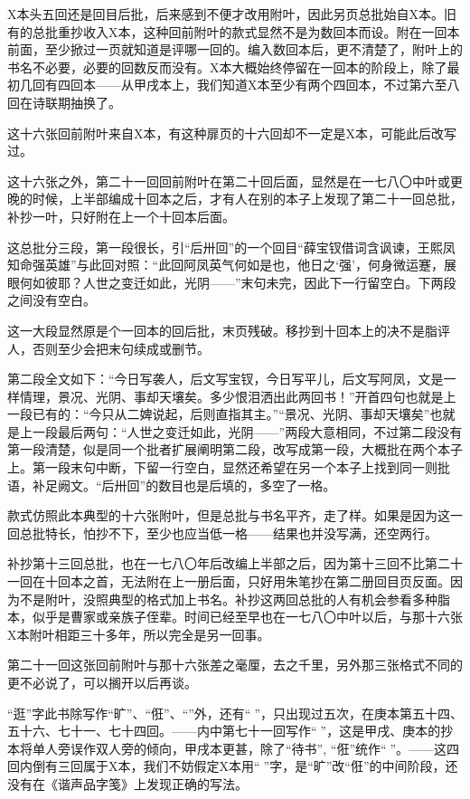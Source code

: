 \par X本头五回还是回目后批，后来感到不便才改用附叶，因此另页总批始自X本。旧有的总批重抄收入X本，这种回前附叶的款式显然不是为数回本而设。附在一回本前面，至少掀过一页就知道是评哪一回的。编入数回本后，更不清楚了，附叶上的书名不必要，必要的回数反而没有。X本大概始终停留在一回本的阶段上，除了最初几回有四回本——从甲戌本上，我们知道X本至少有两个四回本，不过第六至八回在诗联期抽换了。
\par 这十六张回前附叶来自X本，有这种扉页的十六回却不一定是X本，可能此后改写过。
\par 这十六张之外，第二十一回回前附叶在第二十回后面，显然是在一七八〇中叶或更晚的时候，上半部编成十回本之后，才有人在别的本子上发现了第二十一回总批，补抄一叶，只好附在上一个十回本后面。
\par 这总批分三段，第一段很长，引“后卅回”的一个回目“薛宝钗借词含讽谏，王熙凤知命强英雄”与此回对照：“此回阿凤英气何如是也，他日之‘强’，何身微运蹇，展眼何如彼耶？人世之变迁如此，光阴——”末句未完，因此下一行留空白。下两段之间没有空白。
\par 这一大段显然原是个一回本的回后批，末页残破。移抄到十回本上的决不是脂评人，否则至少会把末句续成或删节。
\par 第二段全文如下：“今日写袭人，后文写宝钗，今日写平儿，后文写阿凤，文是一样情理，景况、光阴、事却天壤矣。多少恨泪洒出此两回书！”开首四句也就是上一段已有的：“今只从二婢说起，后则直指其主。”“景况、光阴、事却天壤矣”也就是上一段最后两句：“人世之变迁如此，光阴——”两段大意相同，不过第二段没有第一段清楚，似是同一个批者扩展阐明第二段，改写成第一段，大概批在两个本子上。第一段末句中断，下留一行空白，显然还希望在另一个本子上找到同一则批语，补足阙文。“后卅回”的数目也是后填的，多空了一格。
\par 款式仿照此本典型的十六张附叶，但是总批与书名平齐，走了样。如果是因为这一回总批特长，怕抄不下，至少也应当低一格——结果也并没写满，还空两行。
\par 补抄第十三回总批，也在一七八〇年后改编上半部之后，因为第十三回不比第二十一回在十回本之首，无法附在上一册后面，只好用朱笔抄在第二册回目页反面。因为不是附叶，没照典型的格式加上书名。补抄这两回总批的人有机会参看多种脂本，似乎是曹家或亲族子侄辈。时间已经至早也在一七八〇中叶以后，与那十六张X本附叶相距三十多年，所以完全是另一回事。
\par 第二十一回这张回前附叶与那十六张差之毫厘，去之千里，另外那三张格式不同的更不必说了，可以搁开以后再谈。
\par “逛”字此书除写作“旷”、“俇”、“\QuanWang ”外，还有“𤞘”，只出现过五次，在庚本第五十四、五十六、七十一、七十四回。——内中第七十一回写作“𤞘”，这是甲戌、庚本的抄本将单人旁误作双人旁的倾向，甲戌本更甚，除了“待书”, “俇”统作“𢓯”。——这四回内倒有三回属于X本，我们不妨假定X本用“𤞘”字，是“旷”改“俇”的中间阶段，还没有在《谐声品字笺》上发现正确的写法。
